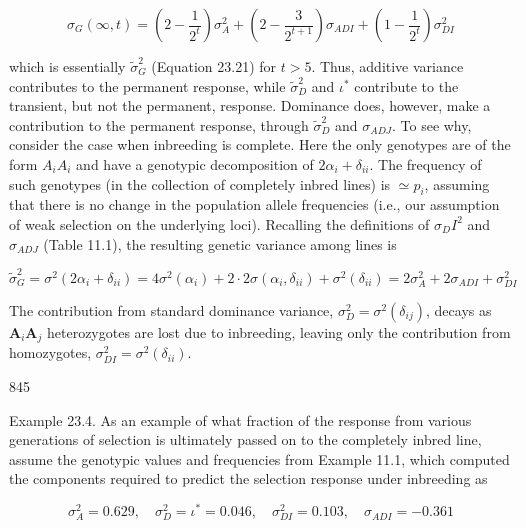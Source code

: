 \documentclass{article}
\begin{document}
\begin{equation}
\sigma_{G}(\infty,t)=\left(2-\frac{1}{2^{t}}\right)\sigma_{A}^{2}+\left(2-\frac{3}{2^{t+1}}\right)\sigma_{A D I}+\left(1-\frac{1}{2^{t}}\right)\sigma_{D I}^{2}
\tag{23.27}
\label{eq:23_27}
\end{equation}

which is essentially  $ \tilde{\sigma}_G^2 $ (Equation 23.21) for  $ t > 5 $. Thus, additive variance contributes to the permanent response, while  $ \tilde{\sigma}_D^2 $ and  $ \iota^* $ contribute to the transient, but not the permanent, response. Dominance does, however, make a contribution to the permanent response, through  $ \tilde{\sigma}_D^2 $ and  $ \sigma_{ADJ} $. To see why, consider the case when inbreeding is complete. Here the only genotypes are of the form  $ A_i A_i $ and have a genotypic decomposition of  $ 2\alpha_i + \delta_{ii} $. The frequency of such genotypes (in the collection of completely inbred lines) is  $ \simeq p_i $, assuming that there is no change in the population allele frequencies (i.e., our assumption of weak selection on the underlying loci). Recalling the definitions of  $ \sigma_DI^2 $ and  $ \sigma_{ADJ} $ (Table 11.1), the resulting genetic variance among lines is

\begin{equation}
\widetilde{\sigma}_{G}^{2}=\sigma^{2}(2\alpha_{i}+\delta_{ii})=4\sigma^{2}(\alpha_{i})+2\cdot2\sigma(\alpha_{i},\delta_{ii})+\sigma^{2}(\delta_{ii})=2\sigma_{A}^{2}+2\sigma_{ADI}+\sigma_{DI}^{2}
\end{equation}

The contribution from standard dominance variance,  $ \sigma_D^2 = \sigma^2(\delta_{ij}) $, decays as  $ \mathbf{A}_i\mathbf{A}_j $ heterozygotes are lost due to inbreeding, leaving only the contribution from homozygotes,  $ \sigma_{DI}^2 = \sigma^2(\delta_{ii}) $.

845

Example 23.4. As an example of what fraction of the response from various generations of selection is ultimately passed on to the completely inbred line, assume the genotypic values and frequencies from Example 11.1, which computed the components required to predict the selection response under inbreeding as

\begin{equation}
\sigma_{A}^{2}=0.629,\quad\sigma_{D}^{2}=\iota^{*}=0.046,\quad\sigma_{D I}^{2}=0.103,\quad\sigma_{A D I}=-0.361
\end{equation}
\end{document}
